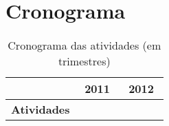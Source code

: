 \documentclass[12pt]{article}
\begin{document}
\section{Cronograma}
\label{sec:cronograma}

\begin{table}[htbp]
  \small
  \centering
  \begin{tabular}{|l||c|c|c|c||c|c|c|c|}
    \hline
    & \multicolumn{4}{|c||}{2011} & \multicolumn{4}{|c||}{2012} \\
    \hline
    \hline
    \textbf{Atividades}
  \end{tabular}
  \caption{Cronograma das atividades (em trimestres)}
  \label{tab:cronograma}
\end{table}

\renewcommand{\refname}{Bibliografia}


\end{document}
